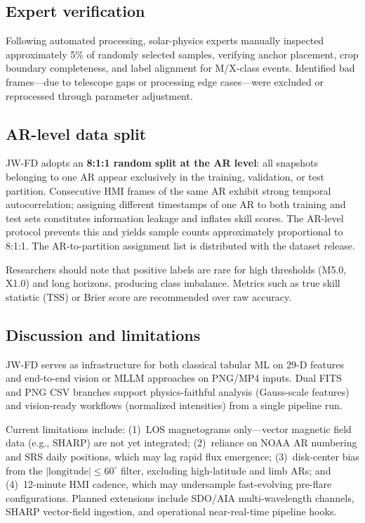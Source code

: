 \documentclass[]{spie}
\begin{document}
\subsection{Expert verification}

Following automated processing, solar-physics experts manually inspected approximately 5\% of randomly selected samples, verifying anchor placement, crop boundary completeness, and label alignment for M/X-class events. Identified bad frames---due to telescope gaps or processing edge cases---were excluded or reprocessed through parameter adjustment.

\subsection{AR-level data split}

JW-FD adopts an \textbf{8:1:1 random split at the AR level}: all snapshots belonging to one AR appear exclusively in the training, validation, or test partition. Consecutive HMI frames of the same AR exhibit strong temporal autocorrelation; assigning different timestamps of one AR to both training and test sets constitutes information leakage and inflates skill scores.\cite{Barnes2016,Leka2019} The AR-level protocol prevents this and yields sample counts approximately proportional to 8:1:1. The AR-to-partition assignment list is distributed with the dataset release.

Researchers should note that positive labels are rare for high thresholds (M5.0, X1.0) and long horizons, producing class imbalance. Metrics such as true skill statistic (TSS) or Brier score are recommended over raw accuracy.\cite{Bloomfield2012}

\subsection{Discussion and limitations}

JW-FD serves as infrastructure for both classical tabular ML on 29-D features and end-to-end vision or MLLM approaches on PNG/MP4 inputs.\cite{Shao2025jwflare,Shao2026jwvl} Dual FITS and PNG CSV branches support physics-faithful analysis (Gauss-scale features) and vision-ready workflows (normalized intensities) from a single pipeline run.

Current limitations include: (1)~LOS magnetograms only---vector magnetic field data (e.g., SHARP) are not yet integrated;\cite{Bobra2014} (2)~reliance on NOAA AR numbering and SRS daily positions, which may lag rapid flux emergence; (3)~disk-center bias from the $|\mathrm{longitude}| \le 60^\circ$ filter, excluding high-latitude and limb ARs; and (4)~12-minute HMI cadence, which may undersample fast-evolving pre-flare configurations. Planned extensions include SDO/AIA multi-wavelength channels, SHARP vector-field ingestion, and operational near-real-time pipeline hooks.
\end{document}
